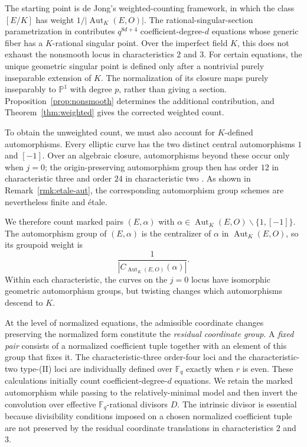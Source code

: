 \documentclass[a4paper,12pt]{amsart}
\theoremstyle{definition}
\newcommand{\Fb}{\mathbb{F}}
\newcommand{\Pb}{\mathbb{P}}
\newcommand{\Aut}{\operatorname{Aut}}
\renewcommand{\setminus}{\smallsetminus}
\begin{document}
\medskip

The starting point is de Jong's weighted-counting framework, in which the class $[E/K]$ has weight $1/|\Aut_K(E,O)|$.  The rational-singular-section parametrization in \cite[Section~4.11]{dJ2} contributes $q^{8d+4}$ coefficient-degree-$d$ equations whose generic fiber has a $K$-rational singular point.  Over the imperfect field $K$, this does not exhaust the nonsmooth locus in characteristics $2$ and $3$.  For certain equations, the unique geometric singular point is defined only after a nontrivial purely inseparable extension of $K$.  The normalization of its closure maps purely inseparably to $\Pb^1$ with degree $p$, rather than giving a section.  Proposition~\ref{prop:nonsmooth} determines the additional contribution, and Theorem~\ref{thm:weighted} gives the corrected weighted count.

\medskip

To obtain the unweighted count, we must also account for $K$-defined automorphisms.  Every elliptic curve has the two distinct central automorphisms $1$ and $[-1]$.  Over an algebraic closure, automorphisms beyond these occur only when $j=0$; the origin-preserving automorphism group then has order $12$ in characteristic three and order $24$ in characteristic two \cite[Appendix~A, Proposition~1.2(c)]{Silverman}.  As shown in Remark~\ref{rmk:etale-aut}, the corresponding automorphism group schemes are nevertheless finite and \'etale.

\medskip

We therefore count marked pairs $(E,\alpha)$ with $\alpha\in\Aut_K(E,O)\setminus\{1,[-1]\}$.  The automorphism group of $(E,\alpha)$ is the centralizer of $\alpha$ in $\Aut_K(E,O)$, so its groupoid weight is
\[
\frac{1}{|C_{\Aut_K(E,O)}(\alpha)|}.
\]
Within each characteristic, the curves on the $j=0$ locus have isomorphic geometric automorphism groups, but twisting changes which automorphisms descend to $K$.

\medskip

At the level of normalized equations, the admissible coordinate changes preserving the normalized form constitute the \emph{residual coordinate group}.  A \emph{fixed pair} consists of a normalized coefficient tuple together with an element of this group that fixes it.  The characteristic-three order-four loci and the characteristic-two type-(II) loci are individually defined over $\Fb_q$ exactly when $r$ is even.  These calculations initially count coefficient-degree-$d$ equations.  We retain the marked automorphism while passing to the relatively-minimal model and then invert the convolution over effective $\Fb_q$-rational divisors $D$.  The intrinsic divisor is essential because divisibility conditions imposed on a chosen normalized coefficient tuple are not preserved by the residual coordinate translations in characteristics $2$ and $3$.
\end{document}
